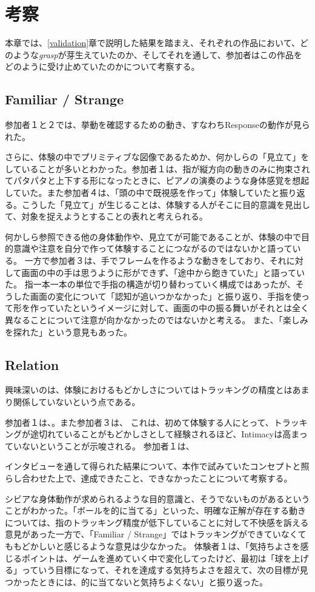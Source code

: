 \chapter{考察}
\label{考察}
本章では、\ref{validation}章で説明した結果を踏まえ、それぞれの作品において、どのような\textit{grasp}が芽生えていたのか、そしてそれを通して、参加者はこの作品をどのように受け止めていたのかについて考察する。

\section{Familiar / Strange}
参加者１と２では、挙動を確認するための動き、すなわちResponseの動作が見られた。

さらに、体験の中でプリミティブな図像であるためか、何かしらの「見立て」をしていることが多いとわかった。参加者１は、指が縦方向の動きのみに拘束されてパタパタと上下する形になったときに、ピアノの演奏のような身体感覚を想起していた。また参加者４は、「頭の中で既視感を作って」体験していたと振り返る。こうした「見立て」が生じることは、体験する人がそこに目的意識を見出して、対象を捉えようとすることの表れと考えられる。

何かしら参照できる他の身体動作や、見立てが可能であることが、体験の中で目的意識や注意を自分で作って体験することにつながるのではないかと語っている。
一方で参加者３は、手でフレームを作るような動きをしており、それに対して画面の中の手は思うように形ができず、「途中から飽きていた」と語っていた。
指一本一本の単位で手指の構造が切り替わっていく構成ではあったが、そうした画面の変化について「認知が追いつかなかった」と振り返り、手指を使って形を作っていたというイメージに対して、画面の中の振る舞いがそれとは全く異なることについて注意が向かなかったのではないかと考える。
また、「楽しみを探れた」という意見もあった。
\section{Relation}
興味深いのは、体験におけるもどかしさについてはトラッキングの精度とはあまり関係していないという点である。

参加者１は、。また参加者３は、
これは、初めて体験する人にとって、トラッキングが途切れていることがもどかしさとして経験されるほど、Intimacyは高まっていないということが示唆される。
参加者１は、

インタビューを通して得られた結果について、本作で試みていたコンセプトと照らし合わせた上で、達成できたこと、できなかったことについて考察する。

シビアな身体動作が求められるような目的意識と、そうでないものがあるということがわかった。「ボールを的に当てる」といった、明確な正解が存在する動きについては、指のトラッキング精度が低下していることに対して不快感を訴える意見があった一方で、「Familiar / Strange」ではトラッキングができていなくてももどかしいと感じるような意見は少なかった。
体験者１は、「気持ちよさを感じるポイントは、ゲームを進めていく中で変化してったけど、最初は「球を上げる」っていう目標になって、それを達成する気持ちよさを超えて、次の目標が見つかったときには、的に当てないと気持ちよくない」と振り返った。

